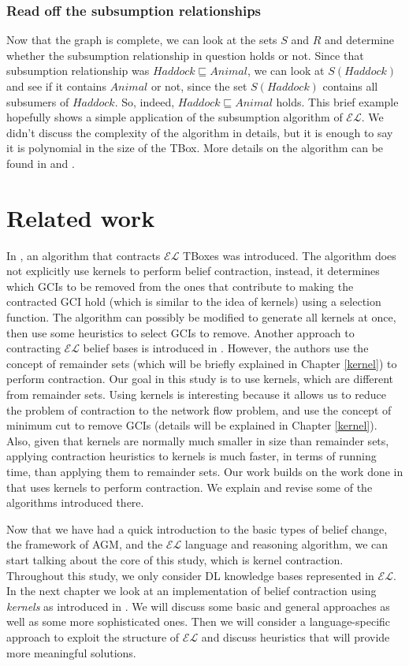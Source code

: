 \subsubsection{Read off the subsumption relationships}
Now that the graph is complete, we can look at the sets $S$ and $R$ and determine whether the subsumption relationship in question holds or not. Since that subsumption relationship was $Haddock \sqsubseteq Animal$, we can look at $S(Haddock)$ and see if it contains $Animal$ or not, since the set $S(Haddock)$ contains all subsumers of $Haddock$. So, indeed, $Haddock \sqsubseteq Animal$ holds. This brief example hopefully shows a simple application of the subsumption algorithm of $\mathcal{EL}$. We didn't discuss the complexity of the algorithm in details, but it is enough to say it is polynomial in the size of the TBox. More details on the algorithm can be found in \cite{small} and \cite{new}.



\section{Related work}
In \cite{contract}, an algorithm that contracts $\mathcal{EL}$ TBoxes was introduced. The algorithm does not explicitly  use kernels to perform belief contraction, instead, it determines which GCIs to be removed from the ones that contribute to making the contracted GCI hold (which is similar to the idea of kernels) using a selection function. The algorithm can possibly be modified to generate all kernels at once, then use some heuristics to select GCIs to remove. Another approach to contracting $\mathcal{EL}$ belief bases is introduced in \cite{remainder}. However, the authors use the concept of remainder sets (which will be briefly explained in Chapter \ref{kernel}) to perform contraction. Our goal in this study is to use kernels, which are different from remainder sets. Using kernels is interesting because it allows us to reduce the problem of contraction to the network flow problem, and use the concept of minimum cut to remove GCIs (details will be explained in Chapter \ref{kernel}). Also, given that kernels are normally much smaller in size than remainder sets, applying contraction heuristics to kernels is much faster, in terms of running time, than applying them to remainder sets. Our work builds on the work done in \cite{zwei} that uses kernels to perform contraction. We explain and revise some of the algorithms introduced there.

Now that we have had a quick introduction to the basic types of belief change, the framework of AGM, and the $\mathcal{EL}$ language and reasoning algorithm, we can start talking about the core of this study, which is kernel contraction. Throughout this study, we only consider DL knowledge bases represented in $\mathcal{EL}$. In the next chapter we look at an implementation of belief contraction using \textit{kernels} as introduced in \cite{zwei}. We will discuss some basic and general approaches as well as some more sophisticated ones. Then we will consider a language-specific approach to exploit the structure of $\mathcal{EL}$ and discuss heuristics that will provide more meaningful solutions. 